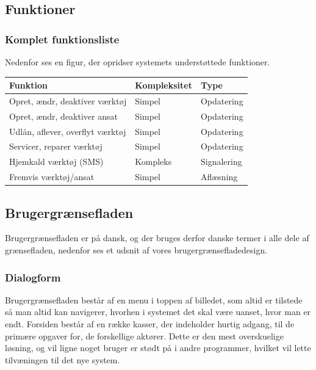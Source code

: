 \documentclass{article}
\begin{document}
\subsection{Funktioner}

\subsubsection{Komplet funktionsliste}

Nedenfor ses en figur, der opridser systemets understøttede funktioner.

\begin{tabular}{p{5cm} p{2.5cm} p{2.5cm}}
\hline
{\bf Funktion} & {\bf Kompleksitet} & {\bf Type} \\
\hline
Opret, ændr, deaktiver værktøj & Simpel & Opdatering \\
Opret, ændr, deaktiver ansat & Simpel & Opdatering \\
Udlån, aflever, overflyt værktøj & Simpel & Opdatering \\
Servicer, reparer værktøj & Simpel & Opdatering \\
Hjemkald værktøj (SMS) & Kompleks & Signalering \\
Fremvis værktøj/ansat & Simpel & Aflæsning \\
\end{tabular}

\subsection{Brugergrænsefladen}
Brugergrænsefladen er på dansk, og der bruges derfor danske termer i alle dele af grænsefladen, nedenfor ses et udsnit af vores brugergrænsefladedesign.

\subsubsection{Dialogform}
Brugergrænsefladen består af en menu i toppen af billedet, som altid er tilstede så man altid kan navigerer, hvorhen i systemet det skal være uanset, hvor man er endt. 
Forsiden består af en række kasser, der indeholder hurtig adgang, til de primære opgaver for, de forskellige aktører. Dette er den mest overskuelige løsning, og vil ligne noget bruger er stødt på i andre programmer, hvilket vil lette tilvæningen til det nye system.
\end{document}
